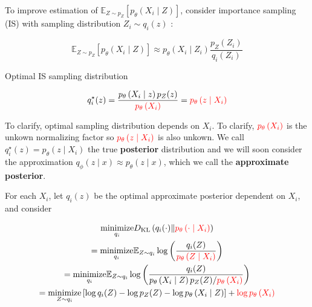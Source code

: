 \documentclass{report}
\begin{document}
\begin{concept}
    To improve estimation of $\mathbb{E}_{Z \sim p_{Z}}\left[p_{\theta}\left(X_{i} \mid Z\right)\right]$, consider importance sampling (IS) with sampling distribution $Z_{i} \sim q_{i}(z)$ :

    $$
    \mathbb{E}_{Z \sim p_{Z}}\left[p_{\theta}\left(X_{i} \mid Z\right)\right] \approx p_{\theta}\left(X_{i} \mid Z_{i}\right) \frac{p_{Z}\left(Z_{i}\right)}{q_{i}\left(Z_{i}\right)}
    $$

    Optimal IS sampling distribution

    $$
    q_{i}^{\star}(z)=\frac{p_{\theta}\left(X_{i} \mid z\right) p_{Z}(z)}{\textcolor{red}{p_{\theta}\left(X_{i}\right)}}=\textcolor{red}{p_{\theta}\left(z \mid X_{i}\right)}
    $$

    To clarify, optimal sampling distribution depends on $X_{i}$.
    To clarify, $\textcolor{red}{p_{\theta}\left(X_{i}\right)}$ is the unkown normalizing factor so $\textcolor{red}{p_{\theta}\left(z \mid X_{i}\right)}$ is also unkown.
    We call $q_{i}^{\star}(z)=p_{\theta}\left(z \mid X_{i}\right)$ the true \textbf{posterior} distribution and we will soon consider the approximation $q_{\phi}(z \mid x) \approx p_{\theta}(z \mid x)$, which we call the \textbf{approximate posterior}.

    \par\noindent\textcolor{gray}{\hdashrule{\textwidth}{0.4pt}{1pt 2pt}}

    For each $X_{i}$, let $q_i(z)$ be the optimal approximate posterior dependent on $X_i$, and consider

    $$
    \begin{gathered}
    \underset{q_{i}}{\operatorname{minimize}} D_{\mathrm{KL}}\left(q_{i}(\cdot) \| \textcolor{red}{p_{\theta}\left(\cdot \mid X_{i}\right)} \right)\\
    =\underset{q_{i}}{\operatorname{minimize}} \mathbb{E}_{Z \sim q_{i}} \log \left(\frac{q_{i}(Z)}{\textcolor{red}{p_{\theta}\left(Z \mid X_{i}\right)}}\right) \\
    =\underset{q_{i}}{\operatorname{minimize}} \mathbb{E}_{Z \sim q_{i}} \log \left(\frac{q_{i}(Z)}{p_{\theta}\left(X_{i} \mid Z\right) p_{Z}(Z) / \textcolor{red}{p_{\theta}\left(X_{i}\right)}}\right) \\
    =\underset{Z \sim q_{i}}{\operatorname{minimize}}\left[\log q_{i}(Z)-\log p_{Z}(Z)-\log p_{\theta}\left(X_{i} \mid Z\right)\right]+\textcolor{red}{\log p_{\theta}\left(X_{i}\right)}
    \end{gathered}
    $$


\end{concept}
\end{document}
